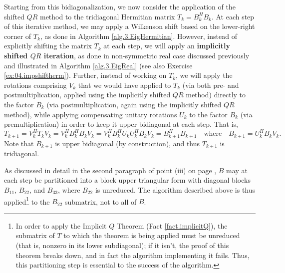 \begin{figure*}[t]
\end{figure*}

Starting from this bidiagonalization, we now consider the application of the shifted $QR$ method to the
tridiagonal Hermitian matrix $T_k=B_k^H B_k$.  At each step of this iterative method, we may apply a Wilkenson shift based on the lower-right corner of $T_k$,
as done in Algorithm \ref{alg.3.EigHermitian}.  However, instead of explicitly shifting the matrix $T_k$ at each step, we will apply an {\bf implicitly shifted $QR$ iteration},
as done in non-symmetric real case discussed previously and illustrated in Algorithm \ref{alg.3.EigReal} (see also Exercise \ref{ex:04.impshiftherm}).
Further, instead of working on $T_k$, we will apply the rotations comprising $V_k$ that we would have applied to $T_k$ (via both pre- and postmultiplication, applied using the implicitly shifted $QR$ method)
directly to the factor $B_k$ (via postmultiplication, again using the implicitly shifted $QR$ method), while applying compensating unitary rotations $U_k$ to the factor $B_k$
(via premultiplication) in order to keep it upper bidiagonal at each step.
That is,
\begin{equation*}
T_{k+1}=V_k^H T_k V_k = V_k^H B_k^H B_k V_k =  V_k^H B_k^H U_k U_k^H B_k V_k = B_{k+1}^H B_{k+1} \quad\textrm{where}\quad B_{k+1}=U_k^H B_k V_k.
\end{equation*}
Note that $B_{k+1}$ is upper bidiagonal (by construction), and thus $T_{k+1}$ is tridiagonal.  

As discussed in detail in the second paragraph of point (iii) on page \pageref{par:T22isolation}, $B$ may at each step be partitioned into a block upper triangular form
with diagonal blocks $B_{11}$, $B_{22}$, and $B_{33}$, where $B_{22}$ is unreduced.  The algorithm described above is thus
applied\footnote{In order to apply the Implicit $Q$ Theorem (Fact \ref{fact.implicitQ}), the submatrix of $T$ to which the theorem is being applied must be unreduced
(that is, nonzero in its lower subdiagonal); if it isn't, the proof
of this theorem breaks down, and in fact the algorithm implementing it fails. Thus, this partitioning step is essential to the success of the algorithm.}
to the $B_{22}$ submatrix, not to all of $B$.


